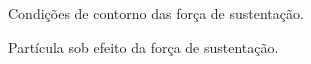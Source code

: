 \documentclass{beamer}
\begin{document}
\begin{frame}
  \frametitle{\subsecname}
  
  \begin{minipage}{.48\textwidth}
    \centering
    \begin{figure}
       {\raggedleft \tiny Condições de contorno das força de sustentação.}
    \end{figure}
  \end{minipage}
  \hfill
  \begin{minipage}{.48\textwidth}
    \begin{figure}
       {\raggedleft \tiny Partícula sob efeito da força de sustentação.}
    \end{figure}
  \end{minipage}
\end{frame}
\end{document}
